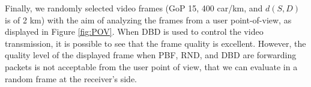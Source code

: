 \documentclass{sig-alternate-2013}
\begin{document}
Finally, we randomly selected video frames (GoP 15, 400 car/km, and $d(S,D)$ is of 2 km) with the aim of analyzing the frames from a user point-of-view, as displayed in Figure \ref{fig:POV}. When DBD is used to control the video transmission, it is possible to see that the frame quality is excellent. However, the quality level of the displayed frame when PBF, RND, and DBD are forwarding packets is not acceptable from the user point of view, that we can evaluate in a random frame at the receiver's side.


\begin{figure}[!t]
	\begin{center} 

\end{center}
\end{figure}
\end{document}
